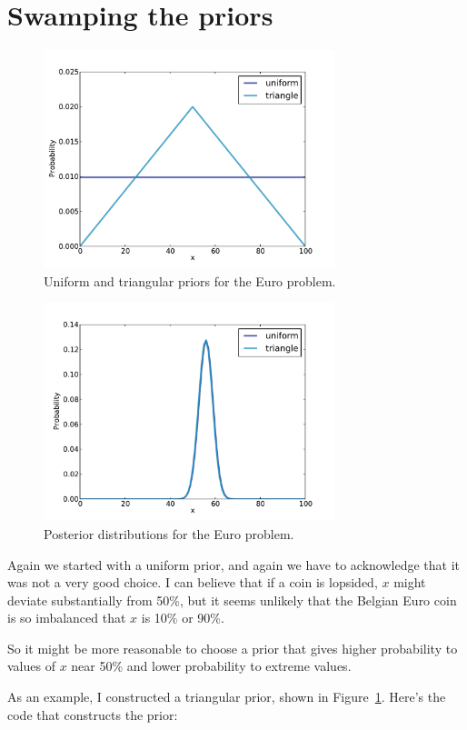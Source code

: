 \documentclass[12pt]{book}
\begin{document}
\section{Swamping the priors}
\label{triangle}

\begin{figure}
\centerline{\includegraphics[height=2.5in]{figs/euro2.pdf}}
\caption{Uniform and triangular priors for the
Euro problem.}
\label{fig.euro2}
\end{figure}

\begin{figure}
\centerline{\includegraphics[height=2.5in]{figs/euro3.pdf}}
\caption{Posterior distributions for the Euro problem.}
\label{fig.euro3}
\end{figure}

Again we started with a uniform prior, and again we have to
acknowledge that it was not a very good choice. I can believe
that if a coin is lopsided, $x$ might deviate substantially from
50\%, but it seems unlikely that the Belgian Euro coin is so
imbalanced that $x$ is 10\% or 90\%.

So it might be more reasonable to choose a prior that gives
higher probability to values of $x$ near 50\% and lower probability
to extreme values.

As an example, I constructed a triangular prior, shown in
Figure~\ref{fig.euro2}.  Here's the code that constructs the prior:
\end{document}
